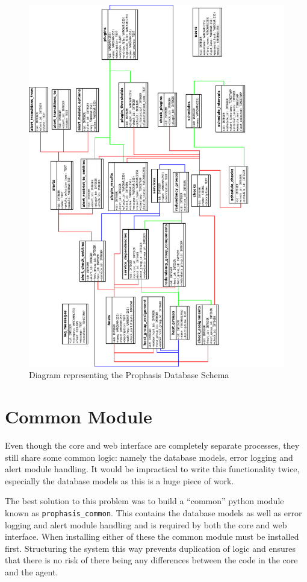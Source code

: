 \documentclass[bsc,deptreport,twoside,parskip,singlespacing,notimes]{infthesis}
\begin{document}
\begin{figure}[H]
	\caption{Diagram representing the Prophasis Database Schema}
	\label{database-diagram}
	\includegraphics[scale=0.84]{assets/schema.pdf}
\end{figure}

\section{Common Module}

	Even though the core and web interface are completely separate processes, they
	still share some common logic: namely the database models, error logging and
	alert module handling.  It would be impractical to write this functionality
	twice, especially the database models as this is a huge piece of work.


	The best solution to this problem was to build a ``common'' python module known
	as \texttt{prophasis\_common}.  This contains the database models as well as
	error logging and alert module handling and is required by both the core and
	web interface.  When installing either of these the common module must be
	installed first.  Structuring the system this way prevents duplication of
	logic and ensures that there is no risk of there being any differences between
	the code in the core and the agent.
\end{document}
